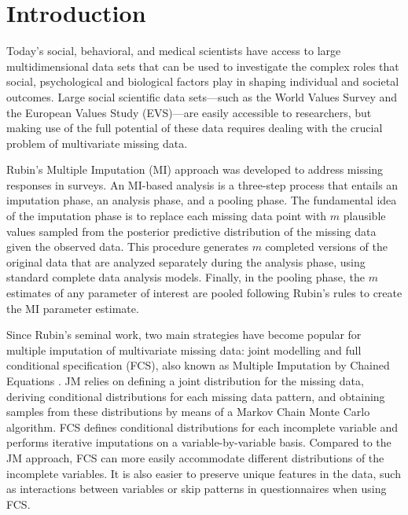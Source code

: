 \section{Introduction}


Today’s social, behavioral, and medical scientists have access to large multidimensional data sets that can be
used to investigate the complex roles that social, psychological and biological factors play in 
shaping individual and societal outcomes.
Large social scientific data sets---such as the World Values Survey and the European Values Study (EVS)---are easily accessible to researchers, but making use of the full potential of these data requires dealing with the crucial problem of multivariate
missing data.

Rubin's Multiple Imputation (MI) approach \citep{rubin:1987} was developed to address missing 
responses in surveys.
An MI-based analysis is a three-step process that entails an imputation phase, an analysis phase, and a pooling phase.
The fundamental idea of the imputation phase is to replace each missing data point with $m$ plausible values sampled from 
the posterior predictive distribution of the missing data given the observed data.
This procedure generates $m$ completed versions of the original data that are analyzed separately during the analysis phase, using standard complete data analysis models.
Finally, in the pooling phase, the $m$ estimates of any parameter of interest are pooled following Rubin's rules \citep{rubin:1987} to create the MI parameter estimate.

Since Rubin's seminal work, two main strategies have become popular for multiple imputation of multivariate 
missing data: joint modelling \citep[JM;][ch. 4]{schafer:1997} and full conditional specification (FCS), also known 
as Multiple Imputation by Chained Equations \citep[MICE;][]{vanBuurenEtAl:2006}.
JM relies on defining a joint distribution for the missing data, deriving conditional
distributions for each missing data pattern, and obtaining samples from these distributions by means of a Markov Chain Monte Carlo 
algorithm.
FCS defines conditional distributions for each incomplete variable and performs iterative imputations on 
a variable-by-variable basis.
Compared to the JM approach, FCS can more easily accommodate different distributions of the incomplete variables. It is also easier to preserve unique features in the data, such as interactions between variables or skip patterns in questionnaires when using FCS.

